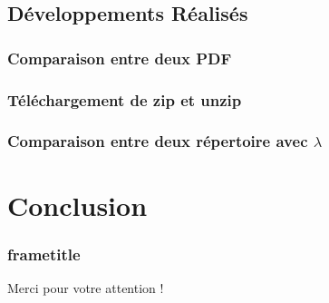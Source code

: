 \documentclass{beamer}
\begin{document}
        \subsection{Développements Réalisés}
        \begin{frame}
        \frametitle{Comparaison entre deux PDF}
            
        \end{frame}
        
        \begin{frame}
        \frametitle{Téléchargement de zip et unzip}
            
        \end{frame}
        
        \begin{frame}
        \frametitle{Comparaison entre deux répertoire avec $\lambda$}
            
        \end{frame}
        
    \section{Conclusion}
        \begin{frame}
        \frametitle{frametitle}
        \end{frame}
        
        \begin{frame}
            \begin{center}
                \Large{Merci pour votre attention !}
            \end{center}
            
        \end{frame}
\end{document}
